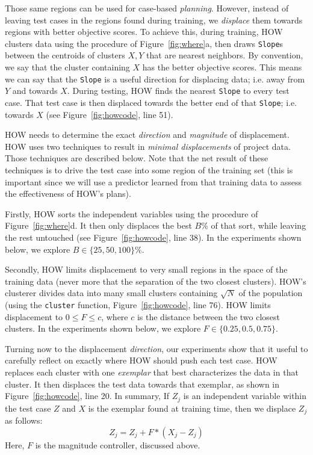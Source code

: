 \documentclass[conference]{IEEEtran}
\newcommand{\fig}[1]{Figure~\ref{fig:#1}}
\begin{document}




Those same regions can be used for case-based 
{\em planning}. However,  instead of leaving test cases in the regions
found during training, we {\em displace} them towards regions
with better objective scores.
To achieve this, 
during training, HOW clusters data using the procedure of \fig{where}a,
then draws {\tt Slope}s between the centroids of  clusters $X,Y$ that are nearest
neighbors.
By convention, we say that the cluster containing $X$ has the  better objective scores. This means we can say that the {\tt Slope} is a useful direction for displacing
data; i.e.  away from $Y$ and towards $X$. 
 During testing,  HOW   finds the  nearest {\tt Slope} to every test case. That  test case is   then displaced towards the better end
of that {\tt Slope}; i.e. towards  $X$ (see \fig{howcode}, line 51).

 HOW needs to  determine the  exact {\em direction} and {\em magnitude} of 
displacement.   
HOW uses two techniques to result in 
{\em minimal displacements} of project data. Those techniques are described below. Note
 that the net result of these techniques is to drive the test case into some region of the training 
 set (this is important since we will use a predictor learned from that training data to assess
 the effectiveness of HOW's plans).
 
 Firstly,
HOW sorts  the independent variables
using the procedure of  \fig{where}d. It then only
displaces the    best $B$\%  of that sort, while leaving the rest untouched
(see \fig{howcode}, line 38).
In  the experiments shown below,  we explore   \mbox{$B \in \{25,50,100\}\%$}.

Secondly, HOW   limits displacement
to very small regions in the space of the training data (never more that the separation
of the two closest clusters).  HOW's clusterer divides  data into many   small clusters containing
$\sqrt{N}$ of the population (using the {\tt cluster} function, \fig{howcode}, line 76).
HOW   limits displacement to  \mbox{$0 \le F \le c$}, where
$c$ is the distance between the two closest clusters. 
In  the experiments shown below,  we explore
\mbox{$F\in \{0.25, 0.5, 0.75\}$}.

Turning now to the displacement {\em direction},
our experiments show that it useful to  carefully reflect on exactly where HOW should  push each test case.
HOW replaces each cluster   with one {\em exemplar} that best
characterizes the data in that cluster. It then displaces the
test data towards that exemplar, as shown in \fig{howcode}, line 20. In summary, 
If  $Z_j$ is an independent variable within the
test case $Z$ and  $X$ is the exemplar found at training time,
then we displace $Z_j$ as follows:
\[Z_j =  Z_j + F*(X_j - Z_j)\]
Here, $F$ is the  magnitude controller, discussed above. 
\end{document}
